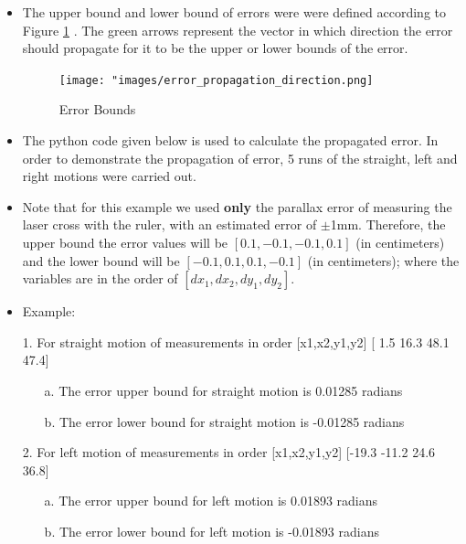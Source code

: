 {\begin{itemize}
           
            
               
          \item The upper bound and lower bound of errors were were defined according to Figure \ref{fig:Error Bounds} . The green arrows represent the vector in which direction the error should propagate for it to be the upper or lower bounds of the error.    
          
          \begin{figure}[ht!] 
                        \centering
                        \texttt{[image: "images/error\_propagation\_direction.png]}
                        \caption{Error Bounds}
                        \label{fig:Error Bounds}
         \end{figure}
                
                
            
        \item The python code given below is used to calculate the propagated error. In order to demonstrate the propagation of error, 5 runs of the straight, left and right motions were carried out. 
        
        \item Note that for this example we used \textbf{only} the parallax error of measuring the laser cross with the ruler, with an estimated error of $\pm$1mm. Therefore, the upper bound the error values will be $[0.1, -0.1, -0.1, 0.1]$ (in centimeters) and the lower bound will be $[-0.1, 0.1, 0.1, -0.1]$ (in centimeters); where the variables are in the order of $[dx_1, dx_2, dy_1, dy_2]$.
        
        \item Example:
        
        \item[1.] For straight motion of measurements in order [x1,x2,y1,y2] [ 1.5 16.3 48.1 47.4]
        
        \begin{itemize}
            \item[a.] The error upper bound for straight motion is 0.01285 radians 
            \item[b.] The error lower bound for straight motion is -0.01285 radians
        \end{itemize}
        
        \item[2.] For left motion of measurements in order [x1,x2,y1,y2] [-19.3 -11.2  24.6  36.8]
        
        \begin{itemize}
            \item[a.] The error upper bound for left motion is 0.01893 radians 
            \item[b.] The error lower bound for left motion is -0.01893 radians 
        \end{itemize}


\end{itemize}}
